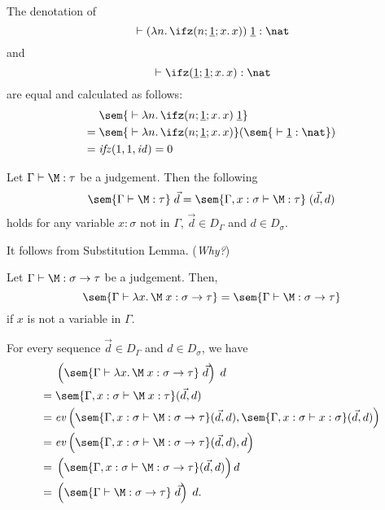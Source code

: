 \begin{frame}
  \begin{example}
    The denotation of 
    \[
      {}\vdash (\lambda n.\,\ifz(n; \underline{1}; x.\, x))\;\underline{1} : \nat
    \]
    and
    \[
      {}\vdash \ifz(\underline{1}; \underline{1}; x.\,x) : \nat
    \]
    are equal and calculated as follows:
    \begin{align*}
          & \sem{{}\vdash \lambda n.\,\ifz(n; \underline{1}; x.\,x)\;\underline{1}}\\
      ={} & \sem{{}\vdash \lambda n.\,\ifz(n; \underline{1}; x.\,x)}( \sem{{}\vdash
        \underline{1} : \nat}) \\
      ={} & \mathit{ifz}(1, 1, \mathit{id}) = 0
    \end{align*}
  \end{example} 
\end{frame}

\begin{frame}
  \begin{lemma}[Weakening]
    Let $\Gamma \vdash \M : \tau$ be a judgement. Then the following
    \[
      \sem{\Gamma \vdash \M : \tau}\;\vec{d}
      = \sem{\Gamma, x : \sigma \vdash \M : \tau}\;(\vec{d}, d)
    \]
    holds for any variable $x : \sigma$ not in $\Gamma$,
    $\vec{d} \in D_\Gamma$ and $d \in D_\sigma$. 
  \end{lemma}
  It follows from Substitution Lemma. (\emph{Why?})
\end{frame}

\begin{frame}
  \begin{corollary}
    Let $\Gamma \vdash \M : \sigma \to \tau$ be a judgement. Then, 
    \[
      \sem{\Gamma \vdash \lambda x.\, \M\; x : \sigma\to\tau}
      = \sem{\Gamma \vdash \M : \sigma\to\tau}
    \]
    if $x$ is not a variable in $\Gamma$. 
  \end{corollary}
  For every sequence $\vec{d} \in D_\Gamma$ and $d \in D_\sigma$, we have
  \begin{align*}
    & \left( \sem{\Gamma \vdash \lambda x.\, \M\; x : \sigma \to \tau}
      \;\vec{d}\right)\; d \\
    ={} & \sem{\Gamma, x : \sigma \vdash \M\;x : \tau}(\vec{d}, d) \\
    ={} & \mathit{ev}\left(
      \sem{\Gamma, x : \sigma \vdash \M : \sigma\to\tau}(\vec{d}, d), 
      \sem{\Gamma, x : \sigma \vdash x : \sigma}(\vec{d}, d)\right)\\
    ={} & \mathit{ev}\left(
      \sem{\Gamma, x : \sigma \vdash \M : \sigma\to\tau}(\vec{d}, d), d\right)\\
    ={} & \left( \sem{\Gamma, x : \sigma \vdash \M : \sigma \to \tau}
      (\vec{d}, d)\right) d \\
    ={} & \left( \sem{\Gamma \vdash \M : \sigma \to \tau}\;\vec{d}\right)\;d. 
  \end{align*}
\end{frame}

